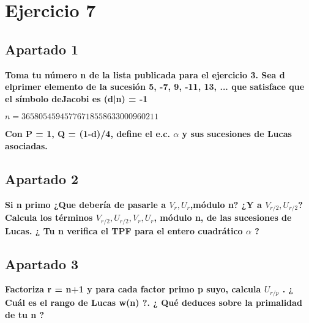 \documentclass[a4paper]{article}
\title {\fbox{\Huge{\textbf{Ejercicio 7}}}}
\author {\fbox{Ana Buendía Ruiz-Azuaga}}
\begin{document}
\maketitle


\section{Ejercicio 7}

\subsection{Apartado 1}

\textbf{Toma tu número n de la lista publicada para el ejercicio 3. Sea d elprimer elemento de la sucesión 5, -7, 9, -11, 13, ... que satisface que el símbolo deJacobi es (d|n) = -1}

$n = 36580545945776718558633000960211$

\textbf{Con P = 1, Q = (1-d)/4, define el e.c. $\alpha$ y sus sucesiones de Lucas asociadas.}

\subsection{Apartado 2}
\textbf{Si n primo ¿Que debería de pasarle a $V_r,U_r$,módulo n? ¿Y a $V_{r/2} ,U_{r/2}$? Calcula los términos $V_{r/2} ,U_{r/2},V_r ,U_r$, módulo n, de las sucesiones de Lucas. ¿ Tu n verifica el TPF para el entero cuadrático $\alpha$ ?}


\subsection{Apartado 3}

\textbf{Factoriza r = n+1 y para cada factor primo p suyo, calcula $U_{r/p}$ . ¿ Cuál es el rango de Lucas w(n) ?. ¿ Qué deduces sobre la primalidad de tu n ?}
\end{document}
